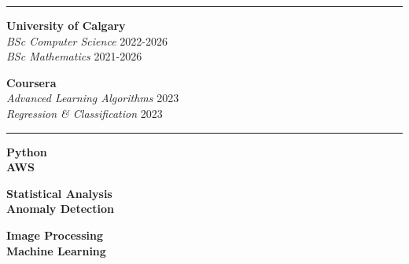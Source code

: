 \documentclass[a4paper,11pt]{article}
\def\sectionv{\vspace{.2cm}}
\def\betweenjobsv{\vspace{0.4cm}}
\def\betweenskillsh{\hspace{1.3cm}}
\begin{document}
\betweenjobsv

\noindent {}
\vspace{-2.35em} %
\par\noindent
\rule{\textwidth}{0.4pt}

\sectionv

\noindent
\begin{minipage}[t]{0.45\textwidth} %
    \textbf{University of Calgary} \\
    \textit{BSc Computer Science} \hfill 2022-2026 \\
    \textit{BSc Mathematics} \hfill 2021-2026
\end{minipage}
\hfill %
\begin{minipage}[t]{0.45\textwidth} %
    \textbf{Coursera} \\
    \textit{Advanced Learning Algorithms} \hfill 2023 \\
    \textit{Regression \& Classification} \hfill 2023
\end{minipage}

\betweenjobsv
\sectionv

\noindent {}
\vspace{-2.35em} %
\par\noindent
\rule{\textwidth}{0.4pt}

\sectionv

\noindent
\begin{minipage}[t]{0.32\textwidth} %
    \textbf{Python} \\
    \textbf{AWS} \\
\end{minipage}
\betweenskillsh
\begin{minipage}[t]{0.32\textwidth} %
    \textbf{Statistical Analysis} \\
    \textbf{Anomaly Detection} \\
\end{minipage}
\betweenskillsh
\begin{minipage}[t]{0.32\textwidth} %
    \textbf{Image Processing} \\
    \textbf{Machine Learning} \\
\end{minipage}
\end{document}
